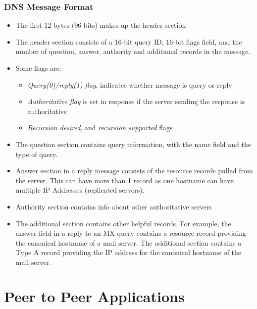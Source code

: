 \documentclass{article}
\theoremstyle{plain}
\theoremstyle{definition}
\begin{document}
\subsubsection{DNS Message Format}
\begin{itemize}
    \item The first 12 bytes (96 bits) makes up the header section
    
    \item The header section consists of a 16-bit query ID, 16-bit flags field, and the number of question, answer, authority and additional records in the message. 
    
    \item Some flags are:
    
    \begin{itemize}
        \item \textit{Query(0)/reply(1) flag}, indicates whether message is query or reply
        
        \item \textit{Authoritative flag} is set in response if the server sending the response is authoritative
        
        \item \textit{Recursion desired}, and \textit{recursion supported} flags
    \end{itemize}
    
    \item The question section contains query information, with the name field and the type of query.
    
    \item Answer section in a reply message consists of the resource records pulled from the server. This can have more than 1 record as one hostname can have multiple IP Addresses (replicated servers).
    
    \item Authority section contains info about other authoritative servers
    
    \item The additional section contains other helpful records. For example, the answer field in a reply to an MX query contains a resource record providing the canonical hostname of a mail server. The additional section contains a Type A record providing the IP address for the canonical hostname of the mail server.
\end{itemize}

\section{Peer to Peer Applications}
\end{document}
